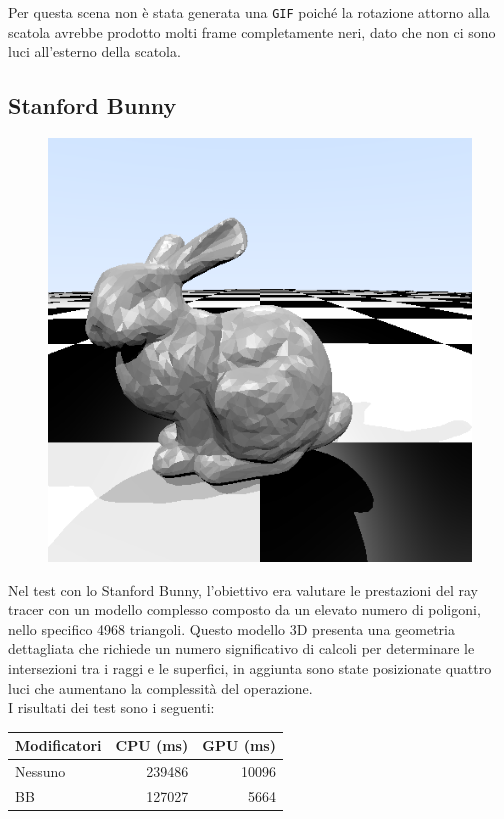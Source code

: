 \documentclass{article}
\begin{document}
Per questa scena non è stata generata una \texttt{GIF} poiché la rotazione attorno alla scatola avrebbe prodotto molti frame completamente neri, dato che non ci sono luci all'esterno della scatola.

\subsection{Stanford Bunny}

\begin{figure}[H]
    \centering
    \includegraphics[width=0.5\linewidth]{bunny.png}
    \label{fig:bunny}
\end{figure}

Nel test con lo Stanford Bunny\cite{Bunny}, l'obiettivo era valutare le prestazioni del ray tracer con un modello complesso composto da un elevato numero di poligoni, nello specifico 4968 triangoli. Questo modello 3D presenta una geometria dettagliata che richiede un numero significativo di calcoli per determinare le intersezioni tra i raggi e le superfici, in aggiunta sono state posizionate quattro luci che aumentano la complessità del operazione.\\

I risultati dei test sono i seguenti:

\begin{table}[H]
    \centering
    \begin{tabular}{|l|r|r|}
    \hline
    \textbf{Modificatori} & \textbf{CPU (ms)}   & \textbf{GPU (ms)} \\ \hline
    Nessuno      & 239486 & 10096 \\ \hline
    BB           & 127027 & 5664  \\ \hline
    \end{tabular}
\end{table}
\end{document}
